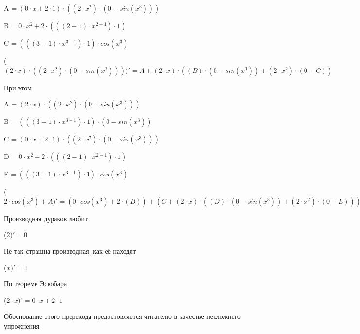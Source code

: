 \documentclass[12pt,a4paper,fleqn]{article}
\begin{document}
\begin{center}
A = $(0 \cdot x+2 \cdot 1) \cdot ((2 \cdot x^{2}) \cdot (0-sin(x^{3})))$\end{center}
\begin{center}
B = $0 \cdot x^{2}+2 \cdot (((2-1) \cdot x^{2-1}) \cdot 1)$\end{center}
\begin{center}
C = $(((3-1) \cdot x^{3-1}) \cdot 1) \cdot cos(x^{3})$\end{center}
\begin{center}
 ($(2 \cdot x) \cdot ((2 \cdot x^{2}) \cdot (0-sin(x^{3}))))'
  = A+(2 \cdot x) \cdot ((B) \cdot (0-sin(x^{3}))+(2 \cdot x^{2}) \cdot (0-C))$\end{center}
При этом

\begin{center}
A = $(2 \cdot x) \cdot ((2 \cdot x^{2}) \cdot (0-sin(x^{3})))$\end{center}
\begin{center}
B = $(((3-1) \cdot x^{3-1}) \cdot 1) \cdot (0-sin(x^{3}))$\end{center}
\begin{center}
C = $(0 \cdot x+2 \cdot 1) \cdot ((2 \cdot x^{2}) \cdot (0-sin(x^{3})))$\end{center}
\begin{center}
D = $0 \cdot x^{2}+2 \cdot (((2-1) \cdot x^{2-1}) \cdot 1)$\end{center}
\begin{center}
E = $(((3-1) \cdot x^{3-1}) \cdot 1) \cdot cos(x^{3})$\end{center}
\begin{center}
 ($2 \cdot cos(x^{3})+A)'
  = (0 \cdot cos(x^{3})+2 \cdot (B))+(C+(2 \cdot x) \cdot ((D) \cdot (0-sin(x^{3}))+(2 \cdot x^{2}) \cdot (0-E)))$\end{center}
Производная дураков любит\cite{link2}

\begin{center}
 ($2)'
  = 0$\end{center}
Не так страшна производная, как её находят\cite{link2}

\begin{center}
 ($x)'
  = 1$\end{center}
По теореме Эскобара

\begin{center}
 ($2 \cdot x)'
  = 0 \cdot x+2 \cdot 1$\end{center}
Обоснование этого пререхода предостовляется читателю в качестве несложного упрожнения
\end{document}
